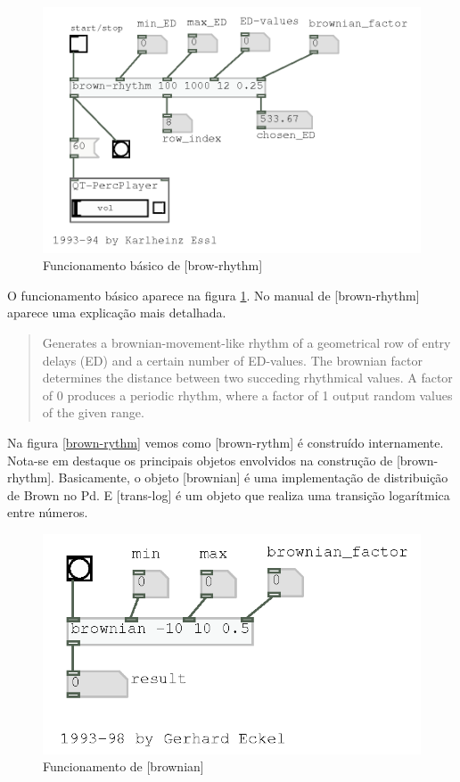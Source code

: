 \documentclass[draft]{ppgmus}
\begin{document}
 \begin{figure}
\includegraphics[scale=.6]{brown-rhythm-func}
\caption{Funcionamento básico de [brow-rhythm]}
\label{brown-rythm-func}
\end{figure} 


O funcionamento básico aparece na figura \ref{brown-rythm-func}.
No manual de [brown-rhythm] aparece uma explicação mais detalhada.


\begin{quote}
Generates a brownian-movement-like rhythm of a geometrical row of
entry delays (ED) and a certain number of ED-values. The brownian factor
determines the distance between two succeding rhythmical values. A factor
of 0 produces a periodic rhythm, where a factor of 1 output random values 
of the given range.
\end{quote}  



Na figura \ref{brown-rythm} vemos como [brown-rythm] é construído internamente.
Nota-se em destaque os principais objetos envolvidos na construção
de [brown-rhythm]. Basicamente, o objeto [brownian] é uma implementação de
distribuição de Brown no Pd. E [trans-log] é um objeto que realiza uma
transição logarítmica entre números.

 \begin{figure}
\includegraphics[scale=.6]{brownian-func}
\caption{Funcionamento de [brownian]}
\label{brownian-func}
\end{figure} 
\end{document}
